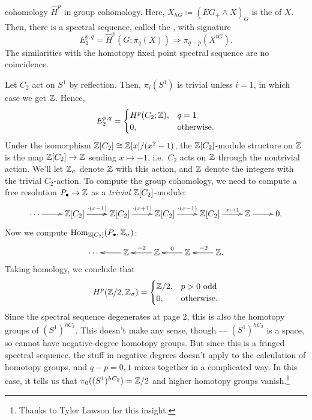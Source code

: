 cohomology $\widehat H^p$ in group cohomology. Here, $X_{hG}\coloneqq (EG_+\wedge X)_G$ is the  of $X$. Then, there is a spectral sequence, called the , with signature
\[E_2^{p,q} = \widehat H^p(G; \pi_q(X)) \Longrightarrow \pi_{q-p}(X^{tG}).\]
The similarities with the homotopy fixed point spectral sequence are no coincidence.
\begin{exm}
\label{reflection}
Let $C_2$ act on $S^1$ by reflection. Then, $\pi_i(S^1)$ is trivial unless $i = 1$, in which case we get $\mathbb Z$.
Hence,
\[E_2^{p,q} = \begin{cases}
	H^p(C_2;\mathbb Z), &q = 1\\
	0, &\text{otherwise}.
\end{cases}\]
Under the isomorphism $\mathbb Z[C_2]\cong \mathbb Z[x]/(x^2-1)$, the $\mathbb Z[C_2]$-module structure on $\mathbb Z$ is the map
$\mathbb Z[C_2]\to\mathbb Z$ sending $x\mapsto -1$, i.e.\ $C_2$ acts on $\mathbb Z$ through the nontrivial action. We'll let $\mathbb Z_\sigma$
denote $\mathbb Z$ with this action, and $\mathbb Z$ denote the integers with the trivial $C_2$-action. To compute the group
cohomology, we need to compute a free resolution $P_\bullet\to\mathbb Z$ as a \emph{trivial} $\mathbb Z[C_2]$-module:
\[\xymatrix{
	\dotsb\ar[r] & \Z[C_2]\ar[r]^{\cdot(x-1)}\ar[r] & \Z[C_2]\ar[r]^{\cdot(x+1)} & \Z[C_2]\ar[r]^{\cdot(x-1)} &
	\Z[C_2]\ar[r]^-{x\mapsto 1} & \Z\ar[r] & 0.
}\]
Now we compute $\operatorname{Hom}_{\mathbb Z[C_2]}(P_\bullet, \mathbb Z_\sigma)$:
\[\xymatrix{
	\dotsb & \Z\ar[l] & \Z\ar[l]_{-2} & \Z\ar[l]_0 & \Z.\ar[l]_{-2}
}\]
Taking homology, we conclude that
\[H^p(\mathbb Z/2, \mathbb Z_\sigma) = \begin{cases}
	\mathbb Z/2, &p > 0\text{ odd}\\
	0, &\text{otherwise.}
\end{cases}\]
Since the spectral sequence degenerates at page $2$, this is also the homotopy groups of $(S^1)^{hC_2}$. This 
 doesn't make any sense, though --- $(S^1)^{hC_2}$ is a space, so cannot have negative-degree
homotopy groups. But since this is a fringed spectral sequence, the stuff in negative degrees doesn't apply to the
calculation of homotopy groups, and $q - p = 0,1$ mixes together in a complicated way. In this case, it tells us
that $\pi_0((S^1)^{hC_2}) = \mathbb Z/2$ and higher homotopy groups vanish.\footnote{Thanks to Tyler Lawson for this
insight.}
\end{exm}
